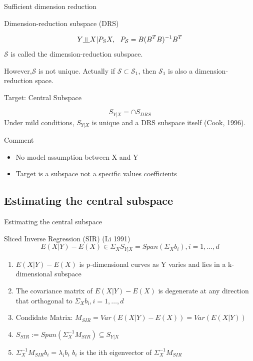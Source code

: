 \documentclass[ignorenonframetext,]{beamer}
\providecommand{\tightlist}{%
  \setlength{\itemsep}{0pt}\setlength{\parskip}{0pt}}
\newcommand{\indep}{\rotatebox[origin=c]{90}{$\models$}}
\begin{document}
\begin{frame}{Sufficient dimension reduction}

\begin{block}{Dimension-reduction subspace (DRS)}

\[
  Y \indep X|P_SX,~~ P_\mathcal{S} = B(B^TB)^{-1}B^T
\] \(\mathcal{S}\) is called the dimension-reduction subspace.

However,\(\mathcal{S}\) is not unique. Actually if
\(\mathcal{S} \subset \mathcal{S}_1\), then \(\mathcal{S}_1\) is also a
dimension-reduction space.

\end{block}

\begin{block}{Target: Central Subspace}

\[
S_{Y|X} = \cap S_{DRS}
\] Under mild conditions, \(S_{Y|X}\) is unique and a DRS subspace
itself (Cook, 1996).

\end{block}

\end{frame}

\begin{frame}{Comment}

\begin{itemize}
\tightlist
\item
  No model assumption between X and Y
\item
  Target is a subspace not a specific values coefficients
\end{itemize}

\end{frame}

\subsection{Estimating the central
subspace}\label{estimating-the-central-subspace}

\begin{frame}{Estimating the central subspace}

\begin{block}{Sliced Inverse Regression (SIR) (Li 1991)}
\[
E(X|Y) - E(X) \in \Sigma_XS_{Y|X} = Span(\Sigma_{X}b_i),i = 1, \dots, d
\]
\end{block}

\begin{enumerate}
\def\labelenumi{\arabic{enumi}.}
\tightlist
\item
  \(E(X|Y) - E(X)\) is p-dimensional curves as Y varies and lies in a
  k-dimensional subspace
\item
  The covariance matrix of \(E(X|Y) - E(X)\) is degenerate at any
  direction that orthogonal to \(\Sigma_{X}b_i,i = 1, \dots, d\)
\item
  Condidate Matrix: \(M_{SIR} = Var(E(X|Y) - E(X)) = Var(E(X|Y))\)
\item
  \(S_{SIR} := Span(\Sigma_{X}^{-1}M_{SIR}) \subseteq S_{Y|X}\)
\item
  \(\Sigma_{X}^{-1}M_{SIR}b_i = \lambda_i b_i\) \(b_i\) is the ith
  eigenvector of \(\Sigma_{X}^{-1}M_{SIR}\)
\end{enumerate}

\end{frame}
\end{document}
